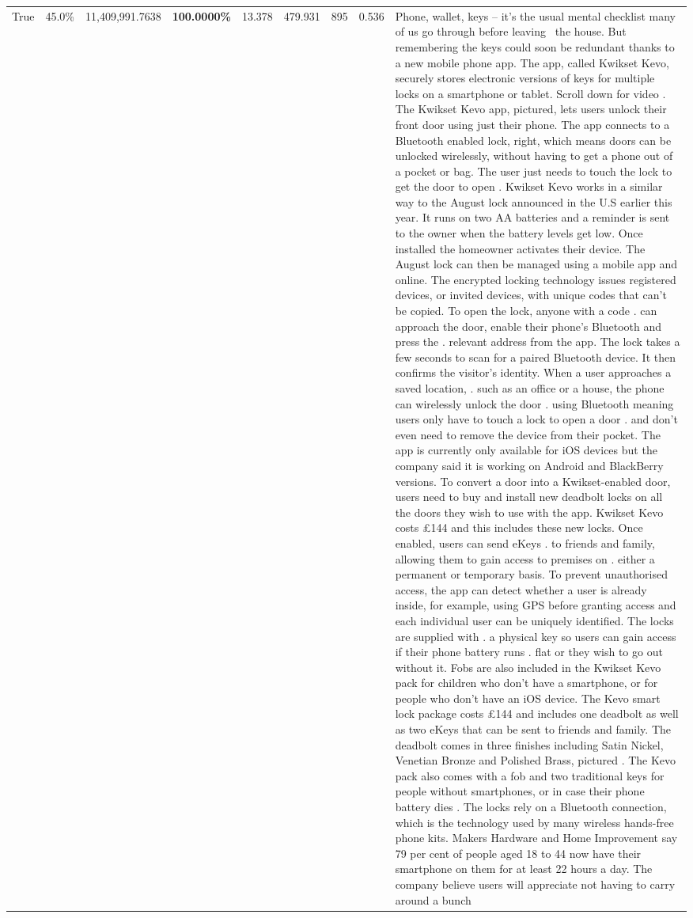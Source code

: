 \begin{table}[H]
\begin{tabular}{lllrlllll}
True & 45.0\% & 11,409,991.7638 & \bfseries \color{red} 100.0000\% & 13.378 & 479.931 & 895 & 0.536 & Phone, wallet, keys – it’s the usual mental checklist many of us go through before leaving  the house. But remembering the keys could soon be redundant thanks to a new mobile phone app. The app, called Kwikset Kevo, securely stores electronic versions of keys for multiple locks on a smartphone or tablet. Scroll down for video . The Kwikset Kevo app, pictured, lets users unlock their front door using just their phone. The app connects to a Bluetooth enabled lock, right, which means doors can be unlocked wirelessly, without having to get a phone out of a pocket or bag. The user just needs to touch the lock to get the door to open . Kwikset Kevo works in a similar way to the August lock announced in the U.S earlier this year. It runs on two AA batteries and a reminder is sent to the owner when the battery levels get low. Once installed the homeowner activates their device. The August lock can then be managed using a mobile app and online. The encrypted locking technology issues registered devices, or invited devices, with unique codes that can't be copied. To open the lock, anyone with a code . can approach the door, enable their phone's Bluetooth and press the . relevant address from the app. The lock takes a few seconds to scan for a paired Bluetooth device. It then confirms the visitor's identity. When a user approaches a saved location, . such as an office or a house, the phone can wirelessly unlock the door . using Bluetooth meaning users only have to touch a lock to open a door . and don't even need to remove the device from their pocket. The app is currently only available for iOS devices but the company said it is working on Android and BlackBerry versions. To convert a door into a Kwikset-enabled door, users need to buy and install new deadbolt locks on all the doors they wish to use with the app. Kwikset Kevo costs £144 and this includes these new locks. Once enabled, users can send eKeys . to friends and family, allowing them to gain access to premises on . either a permanent or temporary basis. To prevent unauthorised access, the app can detect whether a user is already inside, for example, using GPS before granting access and each individual user can be uniquely identified. The locks are supplied with . a physical key so users can gain access if their phone battery runs . flat or they wish to go out without it. Fobs are also included in the Kwikset Kevo pack for children who don't have a smartphone, or for people who don't have an iOS device. The Kevo smart lock package costs £144 and includes one deadbolt as well as two eKeys that can be sent to friends and family. The deadbolt comes in three finishes including Satin Nickel, Venetian Bronze and Polished Brass, pictured . The Kevo pack also comes with a fob and two traditional keys for people without smartphones, or in case their phone battery dies . The locks rely on a Bluetooth connection, which is the technology used by many wireless hands-free phone kits. Makers Hardware and Home Improvement say 79 per cent of people aged 18 to 44 now have their smartphone on them for at least 22 hours a day. The company believe users will appreciate not having to carry around a bunch 
\end{tabular}
\end{table}
